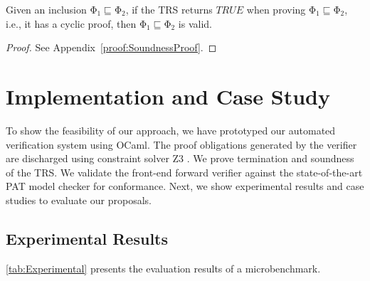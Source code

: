 \documentclass[acmsmall,10pt,review]{acmart}
\newcommand{\effect}{{\ensuremath{\mathrm{\Phi}}}}
\newcommand{\code}[1]{{\tt{\ensuremath{\m{#1}}}}}
\newcommand{\CONTAIN}{\sqsubseteq}
\newcommand{\m}{\mathit}
\newcommand\appref[1]{Appendix~\textcolor{blue}{\ref{#1}}}
\begin{document}
{ \begin{theorem}[Soundness]\label{Cyclicsoundness}
Given an inclusion \code{\effect_1 \CONTAIN \effect_2}, if the TRS returns \code{TRUE} when proving \code{\effect_1 \CONTAIN \effect_2}, i.e., it has a cyclic proof, 
then \code{\effect_1 \CONTAIN \effect_2} is valid.
\end{theorem}


\begin{proof}
See %
\appref{proof:SoundnessProof}.
\end{proof}






\section{Implementation and Case Study}
\label{sec:Evaluation}


To show the feasibility of our approach, we have prototyped 
our automated verification system 
using OCaml. The proof obligations generated by the verifier 
are discharged using constraint solver Z3 
\citep{DBLP:conf/tacas/MouraB08}. 
We prove termination and soundness of the TRS. We validate 
the front-end forward verifier against the state-of-the-art PAT 
\cite{DBLP:conf/cav/SunLDP09} model checker for conformance. 
Next, we show experimental results and case studies to evaluate our proposals. 

\subsection{Experimental Results}
\label{subsec:Experimental_Results}




\autoref{tab:Experimental} presents the evaluation results of a microbenchmark. %




}
\end{document}
